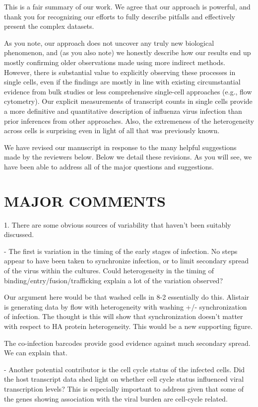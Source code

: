 \documentclass[11pt, oneside]{article}   	%
\begin{document}
{\color{black}
This is a fair summary of our work.
We agree that our approach is powerful, and thank you for recognizing our efforts to fully describe pitfalls and effectively present the complex datasets.

As you note, our approach does not uncover any truly new biological phenomenon, and (as you also note) we honestly describe how our results end up mostly confirming older observations made using more indirect methods.
However, there is substantial value to explicitly observing these processes in single cells, even if the findings are mostly in line with existing circumstantial evidence from bulk studies or less comprehensive single-cell approaches (e.g., flow cytometry).
Our explicit measurements of transcript counts in single cells provide a more definitive and quantitative description of influenza virus infection than prior inferences from other approaches.
Also, the extremeness of the heterogeneity across cells is surprising even in light of all that was previously known.

We have revised our manuscript in response to the many helpful suggestions made by the reviewers below.
Below we detail these revisions.
As you will see, we have been able to address all of the major questions and suggestions.
}

\section*{MAJOR COMMENTS} 

1. There are some obvious sources of variability that haven't been suitably discussed. 

- The first is variation in the timing of the early stages of infection. No steps appear to have been taken to synchronize infection, or to limit secondary spread of the virus within the cultures. Could heterogeneity in the timing of binding/entry/fusion/trafficking explain a lot of the variation observed? 

{\color{red}
Our argument here would be that washed cells in 8-2 essentially do this. Alistair is generating data by flow with heterogeneity with washing +/- synchronization of infection. The thought is this will show that synchronization doesn't matter with respect to HA protein heterogeneity. This would be a new supporting figure.

The co-infection barcodes provide good evidence against much secondary spread. We can explain that.
}

- Another potential contributor is the cell cycle status of the infected cells. Did the host transcript data shed light on whether cell cycle status influenced viral transcription levels? This is especially important to address given that some of the genes showing association with the viral burden are cell-cycle related. 
\end{document}
